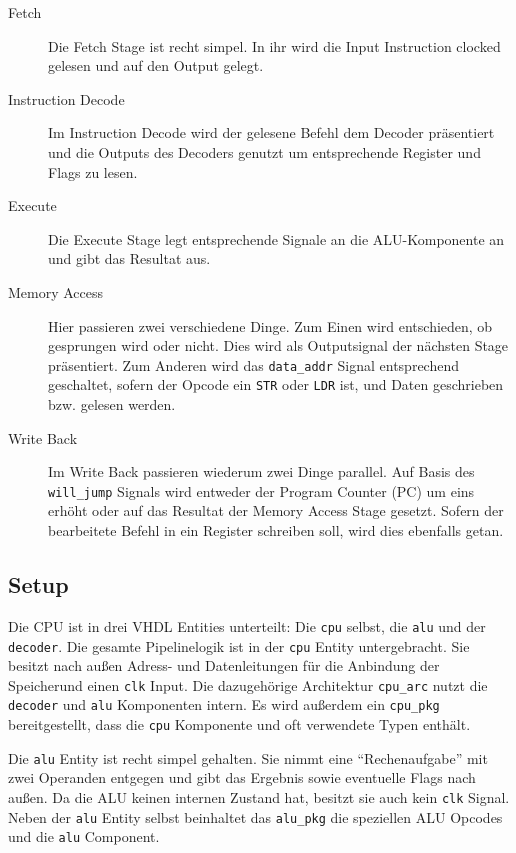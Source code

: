 \documentclass[paper=a4,fontsize=12pt,twocolumn]{scrreprt}
\begin{document}
\begin{description}
  \item[Fetch]
  Die Fetch Stage ist recht simpel.
  In ihr wird die Input Instruction clocked gelesen und auf den Output gelegt.
  \item[Instruction Decode]
  Im Instruction Decode wird der gelesene Befehl dem Decoder präsentiert und die Outputs des Decoders genutzt um entsprechende Register und Flags zu lesen.
  \item[Execute]
  Die Execute Stage legt entsprechende Signale an die ALU-Komponente an und gibt das Resultat aus.
  \item[Memory Access]
  Hier passieren zwei verschiedene Dinge.
  Zum Einen wird entschieden, ob gesprungen wird oder nicht.
  Dies wird als Outputsignal der nächsten Stage präsentiert.
  Zum Anderen wird das \texttt{data\_addr} Signal entsprechend geschaltet, sofern der Opcode ein \texttt{STR} oder \texttt{LDR} ist, und Daten geschrieben bzw. gelesen werden.
  \item[Write Back]
  Im Write Back passieren wiederum zwei Dinge parallel.
  Auf Basis des \texttt{will\_jump} Signals wird entweder der Program Counter (PC) um eins erhöht oder auf das Resultat der Memory Access Stage gesetzt.
  Sofern der bearbeitete Befehl in ein Register schreiben soll, wird dies ebenfalls getan.
\end{description}

\subsection{Setup}

Die CPU ist in drei VHDL Entities unterteilt: Die \texttt{cpu} selbst, die \texttt{alu} und der \texttt{decoder}.
Die gesamte Pipelinelogik ist in der \texttt{cpu} Entity untergebracht.
Sie besitzt nach außen Adress- und Datenleitungen für die Anbindung der Speicher\footnotemark und einen \texttt{clk} Input.
Die dazugehörige Architektur \texttt{cpu\_arc} nutzt die \texttt{decoder} und \texttt{alu} Komponenten intern.
Es wird außerdem ein \texttt{cpu\_pkg} bereitgestellt, dass die \texttt{cpu} Komponente und oft verwendete Typen enthält.

Die \texttt{alu} Entity ist recht simpel gehalten.
Sie nimmt eine \enquote{Rechenaufgabe} mit zwei Operanden entgegen und gibt das Ergebnis sowie eventuelle Flags nach außen.
Da die ALU keinen internen Zustand hat, besitzt sie auch kein \texttt{clk} Signal.
Neben der \texttt{alu} Entity selbst beinhaltet das \texttt{alu\_pkg} die speziellen ALU Opcodes und die \texttt{alu} Component.
\end{document}
